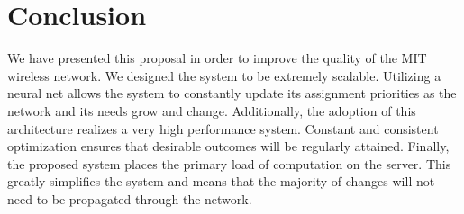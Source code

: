 \documentclass[10pt,journal,compsoc]{IEEEtran}
\begin{document}
		
		\section{Conclusion}
		We have presented this proposal in order to improve the quality of the MIT wireless network. We designed the system to be extremely scalable.  Utilizing a neural net allows the system to constantly update its assignment priorities as the network and its needs grow and change. Additionally, the adoption of this architecture realizes a very high performance system. Constant and consistent optimization ensures that desirable outcomes will be regularly attained. Finally, the proposed system places the primary load of computation on the server. This greatly simplifies the system and means that the majority of changes will not need to be propagated through the network.
		
\end{document}
